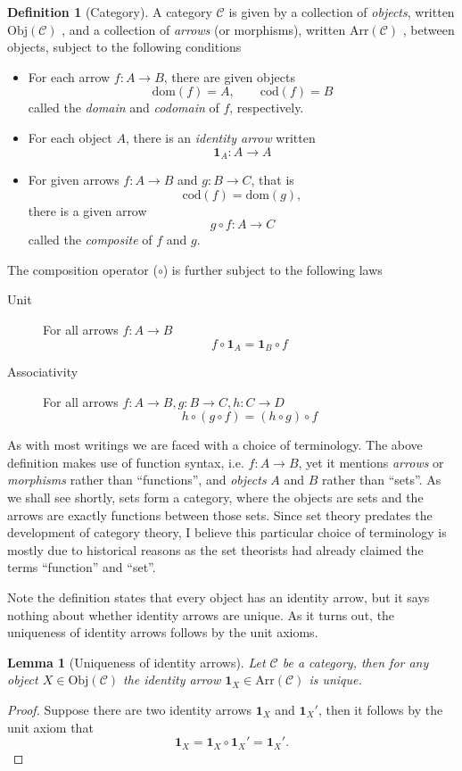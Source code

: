 \documentclass[10pt,twoside,a4paper]{article}
\newcounter{theorem}
\theoremstyle{plain}
\newtheorem{lemma}[thm]{Lemma}
\theoremstyle{definition}
\newtheorem{definition}[thm]{Definition}
\newcommand{\domain}[1]{%
  \mathrm{dom}(#1)%
}
\newcommand{\codomain}[1]{%
  \mathrm{cod}(#1)%
}
\newcommand{\id}[1]{%
  \ensuremath{\mathbf{1}_{#1}}%
}
\newcommand{\Obj}[1]{%
  \ensuremath{\mathrm{Obj}(#1)}%
}
\newcommand{\Arr}[1]{%
  \ensuremath{\mathrm{Arr}(#1)}%
}
\begin{document}
\begin{definition}[Category]
\label{def:cat}
A category $\mathcal{C}$ is given by a collection of \emph{objects},
written \Obj{\mathcal{C}}, and a collection of \emph{arrows} (or
morphisms), written \Arr{\mathcal{C}}, between objects, subject to the
following conditions
\begin{itemize}
  \item For each arrow $f : A \to B$, there are given objects
\[
  \domain{f} = A, \qquad \codomain{f} = B
\]
called the \emph{domain} and \emph{codomain} of $f$, respectively.

  \item For each object $A$, there is an \emph{identity arrow} written
\[
  \id{A} : A \to A
\]

  \item For given arrows $f : A \to B$ and $g : B \to C$, that is
\[
  \codomain{f} = \domain{g},
\]
  there is a given arrow
\[
  g \circ f : A \to C
\]
called the \emph{composite} of $f$ and $g$.
\end{itemize}
The composition operator ($\circ$) is further subject to the following
laws
\begin{description}
  \item[Unit] For all arrows $f : A \to B$
\[
  f \circ \id{A} = \id{B} \circ f
\]

  \item[Associativity] For all arrows $f : A \to B, g : B \to C, h : C \to D$
\[
  h \circ (g \circ f) = (h \circ g) \circ f
\]
\end{description}
\end{definition}

As with most writings we are faced with a choice of terminology. The
above definition makes use of function syntax, i.e.  $f : A \to B$,
yet it mentions \emph{arrows} or \emph{morphisms} rather than
``functions'', and \emph{objects} $A$ and $B$ rather than ``sets''. As
we shall see shortly, sets form a category, where the objects are sets
and the arrows are exactly functions between those sets. Since set
theory predates the development of category theory, I believe this
particular choice of terminology is mostly due to historical reasons
as the set theorists had already claimed the terms ``function'' and
``set''.

Note the definition states that every object has an identity arrow,
but it says nothing about whether identity arrows are unique. As it
turns out, the uniqueness of identity arrows follows by the unit
axioms.
%
\begin{lemma}[Uniqueness of identity arrows]
  Let $\mathcal{C}$ be a category, then for any object
  $X \in \Obj{\mathcal{C}}$ the identity arrow
  $\id{X} \in \Arr{\mathcal{C}}$ is unique.
\end{lemma}
\begin{proof}
  Suppose there are two identity arrows $\id{X}$ and $\id{X}'$, then
  it follows by the unit axiom that
\[
  \id{X} = \id{X} \circ \id{X}' = \id{X}'.
\]
\end{proof}
\end{document}
